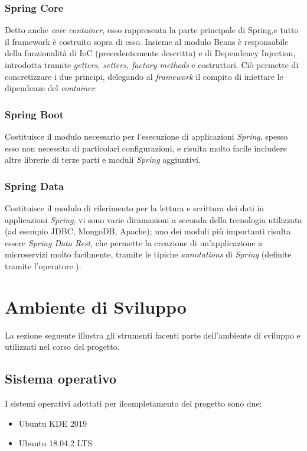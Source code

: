 \subsubsection{Spring Core}
Detto anche \textit{core container}, esso rappresenta la parte principale di Spring,e tutto il framework è costruito sopra di esso.
Insieme al modulo Beans è responsabile della funzionalità di IoC (precedentemente descritta) e  di Dependency Injection, introdotta tramite \textit{getters, setters, factory methods} e costruttori.
Ciò permette di concretizzare i due principi, delegando al \textit{framework} il compito di iniettare le dipendenze del \textit{container}.



\subsubsection{Spring Boot}
Costituisce il modulo necessario per l'esecuzione di applicazioni \textit{Spring}, spesso esso non necessita di particolari configurazioni, e risulta molto facile includere altre librerie di terze parti e moduli \textit{Spring} aggiuntivi.\\

\subsubsection{Spring Data}
Costituisce il modulo di riferimento per la lettura e scrittura dei dati in applicazioni \textit{Spring}, vi sono varie diramazioni 	a seconda della tecnologia utilizzata (ad esempio JDBC, MongoDB, Apache); uno dei moduli più importanti risulta essere \textit{Spring Data Rest}, che permette la creazione di un'applicazione a microservizi molto facilmente, tramite le tipiche \textit{annotations} di \textit{Spring} (definite tramite l'operatore \@).

\section{Ambiente di Sviluppo}
La sezione seguente illustra gli strumenti facenti parte dell'ambiente di sviluppo e utilizzati nel corso del progetto.

\subsection{Sistema operativo}
I sistemi operativi adottati per ilcompletamento del progetto sono due:
\begin{itemize}
	\item Ubuntu KDE 2019
	\item Ubuntu 18.04.2 LTS
\end{itemize}

